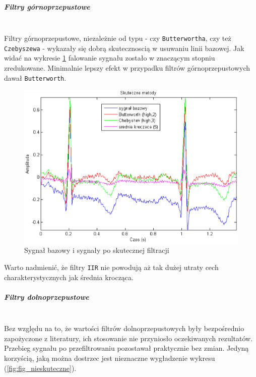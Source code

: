 \documentclass[a4paper, 11pt]{article}
\begin{document}
\subparagraph{Filtry górnoprzepustowe}
\mbox{} \\
Filtry górnoprzepustowe, niezależnie od typu - czy \verb|Butterwortha|, czy też \verb|Czebyszewa| - wykazały się dobrą skutecznoscią w usuwaniu linii bazowej. Jak widać na wykresie \ref{fig:fig_skuteczne} falowanie sygnału zostało w znaczącym stopniu zredukowane. Minimalnie lepszy efekt w przypadku filtrów górnoprzepustowych dawał \verb|Butterworth|.

\begin{figure}[h]
\centering
\includegraphics[scale=0.8]{include/fig_skuteczne.eps}
\caption{Sygnał bazowy i sygnały po skutecznej filtracji}
\label{fig:fig_skuteczne}
\end{figure}

Warto nadmienić, że filtry \verb|IIR| nie powodują aż tak dużej utraty cech charakterystycznych jak średnia krocząca. 

\subparagraph{Filtry dolnoprzepustowe}
\mbox{} \\
Bez względu na to, że wartości filtrów dolnoprzepustowych były bezpośrednio zapożyczone z literatury, ich stosowanie nie przyniosło oczekiwanych rezultatów. Przebieg sygnału po przefiltrowaniu pozostawał praktycznie bez zmian. Jedyną korzyścią, jaką można dostrzec jest nieznaczne wygładzenie wykresu (\ref{fig:fig_nieskuteczne}).
\end{document}
